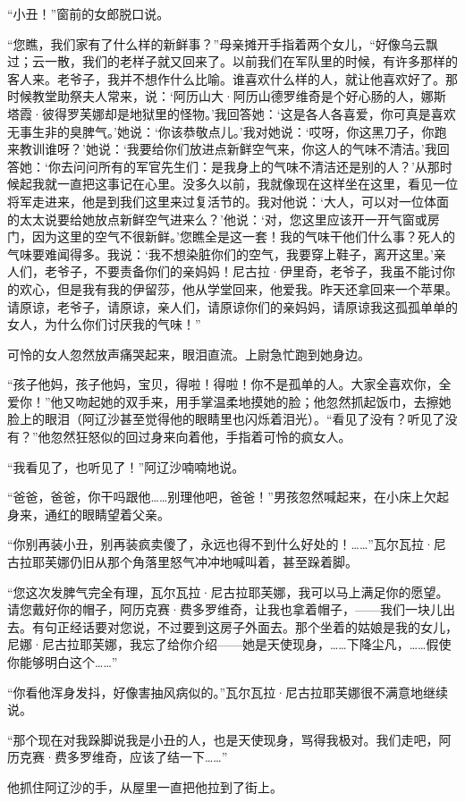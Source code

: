\par “小丑！”窗前的女郎脱口说。
\par “您瞧，我们家有了什么样的新鲜事？”母亲摊开手指着两个女儿，“好像乌云飘过；云一散，我们的老样子就又回来了。以前我们在军队里的时候，有许多那样的客人来。老爷子，我并不想作什么比喻。谁喜欢什么样的人，就让他喜欢好了。那时候教堂助祭夫人常来，说：‘阿历山大·阿历山德罗维奇是个好心肠的人，娜斯塔霞·彼得罗芙娜却是地狱里的怪物。’我回答她：‘这是各人各喜爱，你可真是喜欢无事生非的臭脾气。’她说：‘你该恭敬点儿。’我对她说：‘哎呀，你这黑刀子，你跑来教训谁呀？’她说：‘我要给你们放进点新鲜空气来，你这人的气味不清洁。’我回答她：‘你去问问所有的军官先生们：是我身上的气味不清洁还是别的人？’从那时候起我就一直把这事记在心里。没多久以前，我就像现在这样坐在这里，看见一位将军走进来，他是到我们这里来过复活节的。我对他说：‘大人，可以对一位体面的太太说要给她放点新鲜空气进来么？’他说：‘对，您这里应该开一开气窗或房门，因为这里的空气不很新鲜。’您瞧全是这一套！我的气味干他们什么事？死人的气味要难闻得多。我说：‘我不想染脏你们的空气，我要穿上鞋子，离开这里。’亲人们，老爷子，不要责备你们的亲妈妈！尼古拉·伊里奇，老爷子，我虽不能讨你的欢心，但是我有我的伊留莎，他从学堂回来，他爱我。昨天还拿回来一个苹果。请原谅，老爷子，请原谅，亲人们，请原谅你们的亲妈妈，请原谅我这孤孤单单的女人，为什么你们讨厌我的气味！”
\par 可怜的女人忽然放声痛哭起来，眼泪直流。上尉急忙跑到她身边。
\par “孩子他妈，孩子他妈，宝贝，得啦！得啦！你不是孤单的人。大家全喜欢你，全爱你！”他又吻起她的双手来，用手掌温柔地摸她的脸；他忽然抓起饭巾，去擦她脸上的眼泪（阿辽沙甚至觉得他的眼睛里也闪烁着泪光）。“看见了没有？听见了没有？”他忽然狂怒似的回过身来向着他，手指着可怜的疯女人。
\par “我看见了，也听见了！”阿辽沙喃喃地说。
\par “爸爸，爸爸，你干吗跟他……别理他吧，爸爸！”男孩忽然喊起来，在小床上欠起身来，通红的眼睛望着父亲。
\par “你别再装小丑，别再装疯卖傻了，永远也得不到什么好处的！……”瓦尔瓦拉·尼古拉耶芙娜仍旧从那个角落里怒气冲冲地喊叫着，甚至跺着脚。
\par “您这次发脾气完全有理，瓦尔瓦拉·尼古拉耶芙娜，我可以马上满足你的愿望。请您戴好你的帽子，阿历克赛·费多罗维奇，让我也拿着帽子，——我们一块儿出去。有句正经话要对您说，不过要到这房子外面去。那个坐着的姑娘是我的女儿，尼娜·尼古拉耶芙娜，我忘了给你介绍——她是天使现身，……下降尘凡，……假使你能够明白这个……”
\par “你看他浑身发抖，好像害抽风病似的。”瓦尔瓦拉·尼古拉耶芙娜很不满意地继续说。
\par “那个现在对我跺脚说我是小丑的人，也是天使现身，骂得我极对。我们走吧，阿历克赛·费多罗维奇，应该了结一下……”
\par 他抓住阿辽沙的手，从屋里一直把他拉到了街上。
